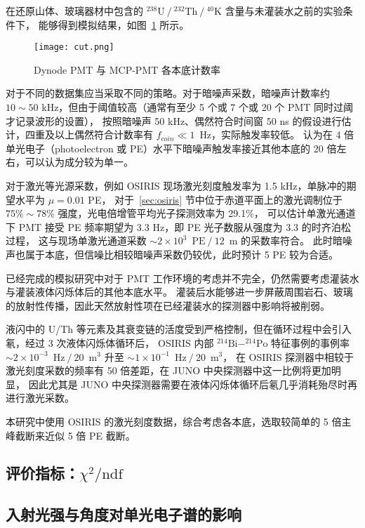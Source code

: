 在还原山体、玻璃器材中包含的 $^{238}\text{U}\ /\ ^{232}\text{Th}\ /\ ^{40}\text{K}$ 含量与未灌装水之前的实验条件下，
能够得到模拟结果，如图~\ref{fig:cut} 所示。

\begin{figure}
    \centering
    \texttt{[image: cut.png]}
    \caption{Dynode PMT 与 MCP-PMT 各本底计数率\cite{zhangStudy20inchPMTs2022}}
    \label{fig:cut}
\end{figure}

对于不同的数据集应当采取不同的策略。对于暗噪声采数，暗噪声计数率约 $10\sim50$ kHz，但由于阈值较高（通常有至少 5 个或 7 个或 20 个 PMT 同时过阈才记录波形的设置），
按照暗噪声 50 kHz、偶然符合时间窗 50 ns 的假设进行估计，四重及以上偶然符合计数率有 $f_{coin}\ll1\enspace\text{Hz}$，实际触发率较低。
认为在 4 倍单光电子（photoelectron 或 PE）水平下暗噪声触发率接近其他本底的 20 倍左右，可以认为成分较为单一。

对于激光等光源采数，例如 OSIRIS 现场激光刻度触发率为 1.5 kHz，单脉冲的期望水平为 $\mu=0.01$ PE\cite{junocollaborationDesignSensitivityJUNO2021}，
对于~\ref{sec:osiris} 节中位于赤道平面上的激光调制位于 $75\%\sim78\%$ 强度，光电倍增管平均光子探测效率为 29.1\%\cite{JUNOPhysicsDetector2022}，
可以估计单激光通道下 PMT 接受 PE 频率期望为 3.3 Hz，即 PE 光子数服从强度为 3.3 的时齐泊松过程，
这与现场单激光通道采数 $\sim2\times10^{3}\enspace\text{PE}\ /\ 12\enspace\text{m}$ 的采数率符合。
此时暗噪声也属于本底，但信噪比相较暗噪声采数仍较优，此时预计 5 PE 较为合适。

已经完成的模拟研究中对于 PMT 工作环境的考虑并不完全，仍然需要考虑灌装水与灌装液体闪烁体后的其他本底水平。
灌装后水能够进一步屏蔽周围岩石、玻璃的放射性传播，因此天然放射性项在已经灌装水的探测器中影响将被削弱。

液闪中的 U/Th 等元素及其衰变链的活度受到严格控制，但在循环过程中会引入氡，经过 3 次液体闪烁体循环后，
OSIRIS 内部 $^{214}\text{Bi}-^{214}\text{Po}$ 特征事例的事例率 $\sim2\times10^{-3}\enspace\text{Hz}\ /\ 20\enspace\text{m}^3$ 
升至 $\sim1\times10^{-1}\enspace\text{Hz}\ /\ 20\enspace\text{m}^3$，
在 OSIRIS 探测器中相较于激光刻度采数的频率有 50 倍差距，在 JUNO 中央探测器中这一比例将更加明显，
因此尤其是 JUNO 中央探测器需要在液体闪烁体循环后氡几乎消耗殆尽时再进行激光采数。

本研究中使用 OSIRIS 的激光刻度数据，综合考虑各本底，选取较简单的 5 倍主峰截断来近似 5 倍 PE 截断。

\subsection{评价指标：$\chi^2/\text{ndf}$}\label{sec:criterion}

\subsection{入射光强与角度对单光电子谱的影响}
